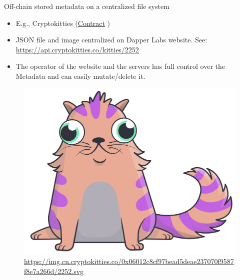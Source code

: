 \documentclass[handout]{beamer}
\begin{document}
\begin{frame}{Off-chain stored metadata on a centralized file system}
\begin{itemize}
	\item E.g., Cryptokitties (\href{https://etherscan.io/address/0x06012c8cf97bead5deae237070f9587f8e7a266d}{Contract} \link)
	\item JSON file and image centralized on Dapper Labs website. See: \link \href{https://api.cryptokitties.co/kitties/2252}{https://api.cryptokitties.co/kitties/2252}
	\item The operator of the website and the servers has full control over the Metadata and can easily mutate/delete it.
\end{itemize}
\vspace{1em}
\begin{figure}
	\centering
	\includegraphics[scale=0.2]{../assets/images/cryptokitty.png}
	\caption*{\link \href{https://img.cn.cryptokitties.co/0x06012c8cf97bead5deae237070f9587f8e7a266d/2252.svg} {\tiny https://img.cn.cryptokitties.co/0x06012c8cf97bead5deae237070f9587f8e7a266d/2252.svg}	}
\end{figure}
\end{frame}
\end{document}
